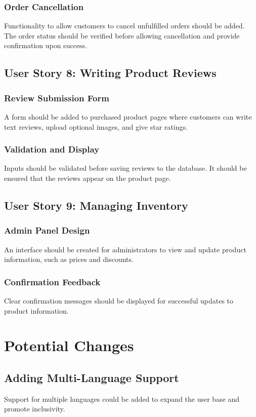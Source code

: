 \documentclass[twoside,a4paper,journal]{IEEEtran}
\begin{document}
\subsubsection{Order Cancellation}
Functionality to allow customers to cancel unfulfilled orders should be added.
The order status should be verified before allowing cancellation and provide
confirmation upon success.

\subsection{User Story 8: Writing Product Reviews}
\subsubsection{Review Submission Form}
A form should be added to purchased product pages where customers can write text
reviews, upload optional images, and give star ratings.
\subsubsection{Validation and Display}
Inputs should be validated before saving reviews to the database.
It should be ensured that the reviews appear on the product page.

\subsection{User Story 9: Managing Inventory}
\subsubsection{Admin Panel Design}
An interface should be created for administrators to view and update product
information, such as prices and discounts.
\subsubsection{Confirmation Feedback}
Clear confirmation messages should be displayed for successful updates to
product information.

\section{Potential Changes}
\subsection{Adding Multi-Language Support}
Support for multiple languages could be added to expand the user base and
promote inclusivity.
\end{document}
